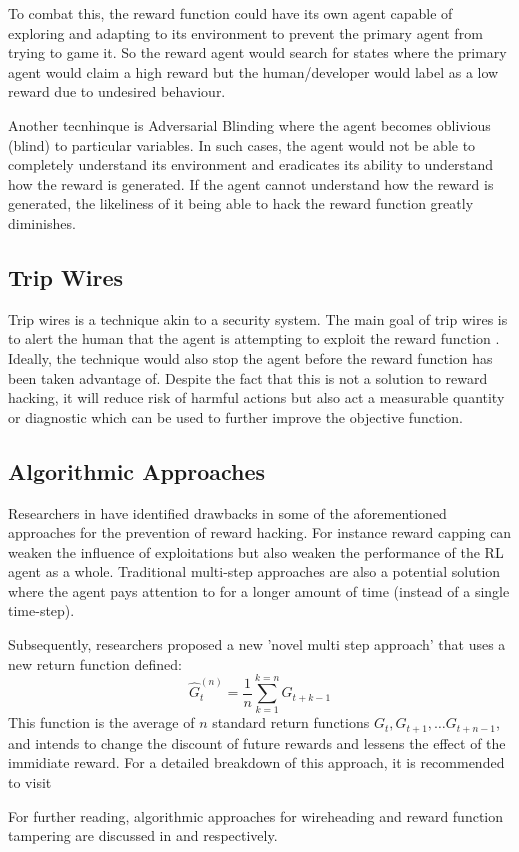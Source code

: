To combat this, the reward function could have its own agent capable of exploring and adapting to its environment to prevent the primary agent from trying to game it.
So the reward agent would search for states where the primary agent would claim a high reward but the human/developer would label as a low reward due to undesired behaviour.

Another tecnhinque is Adversarial Blinding where the agent becomes oblivious (blind) to particular variables.
In such cases, the agent would not be able to completely understand its environment and eradicates its ability to understand how the reward is generated.
If the agent cannot understand how the reward is generated, the likeliness of it being able to hack the reward function greatly diminishes.

\subsection{Trip Wires}
Trip wires is a technique akin to a security system. The main goal of trip wires is to alert the human that the agent is attempting to exploit the reward function \cite{Amodei}.
Ideally, the technique would also stop the agent before the reward function has been taken advantage of.
Despite the fact that this is not a solution to reward hacking, it will reduce risk of harmful actions but also act a measurable quantity or diagnostic which can be used to further improve the objective function.

\subsection{Algorithmic Approaches}
Researchers in \cite{multi-step} have identified drawbacks in some of the aforementioned approaches for the prevention of reward hacking.
For instance reward capping can weaken the influence of exploitations but also weaken the performance of the RL agent as a whole.
Traditional multi-step approaches are also a potential solution where the agent pays attention to for a longer amount of time (instead of a single time-step).

Subsequently, researchers proposed a new 'novel multi step approach' that uses a new return function defined:
\begin{equation}
    \hat{G}_t^{(n)} = \frac{1}{n} \sum^{k=n}_{k=1} G_{t+k-1}
\end{equation}
This function is the average of $n$ standard return functions $G_t, G_{t+1},\dots G_{t+n-1}$, and 
intends to change the discount of future rewards and lessens the effect of the immidiate reward.
For a detailed breakdown of this approach, it is recommended to visit \cite{multi-step}

For further reading, algorithmic approaches for wireheading and reward function tampering are discussed in \cite{Wireheading} and \cite{DBLP:journals/corr/abs-1908-04734} respectively.
